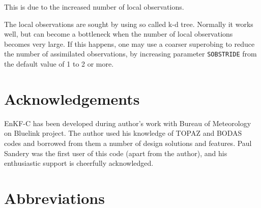 \documentclass[11pt]{report}
\begin{document}
This is due to the increased number of local observations.

The local observations are sought by using so called k-d tree.
Normally it works well, but can become a bottleneck when the number of local observations becomes very large.
If this happens, one may use a coarser superobing to reduce the number of assimilated observations, by increasing parameter \verb|SOBSTRIDE| from the default value of 1 to 2 or more.

\chapter*{Acknowledgements}

EnKF-C has been developed during author's work with Bureau of Meteorology on Bluelink project.
The author used his knowledge of TOPAZ \citep{sak12b} and BODAS \citep{oke08b} codes and borrowed from them a number of design solutions and features.
Paul Sandery was the first user of this code (apart from the author), and his enthusiastic support is cheerfully acknowledged.

\clearpage

\nocite{eve94a}
\nocite{eve03a}
\nocite{hun04a}
\nocite{hun07a}
\nocite{sak08a}
\nocite{sak10a}
\nocite{sak11a}




\clearpage

\chapter*{Abbreviations}
\end{document}
